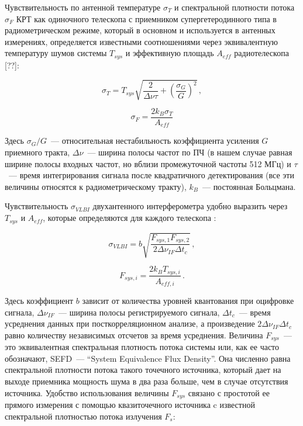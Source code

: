 Чувствительность по антенной температуре $\sigma_T$
и спектральной плотности потока $\sigma_F$ КРТ как одиночного телескопа с приемником
супергетеродинного типа в радиометрическом режиме, который в основном и используется в антенных
измерениях, определяется известными соотношениями через
эквивалентную температуру шумов системы $T_{sys}$ и
эффективную площадь $A_{eff}$ радиотелескопа [??]:

\begin{equation}
 \sigma_T = T_{sys} \sqrt{\frac{2}{\Delta\nu \tau} + \left(\frac{\sigma_G}{G}\right)^2}\,,
\end{equation}

\begin{equation}
 \sigma_F = \frac{2 k_B \sigma_T}{A_{eff}}
\end{equation}

Здесь $\sigma_G/G$~--- относительная нестабильность коэффициента усиления $G$ приемного тракта,
$\Delta \nu$~--- ширина полосы частот по ПЧ (в нашем случае
равная ширине полосы входных частот, но вблизи
промежуточной частоты 512 МГц) и $\tau$~--- время интегрирования сигнала после квадратичного
детектирования (все эти величины относятся к радиометрическому тракту), $k_B$~--- постоянная
Больцмана.

Чувствительность $\sigma_{VLBI}$ двухантенного интерферометра
удобно выразить через $T_{sys}$ и $A_{eff}$, которые определяются для каждого телескопа
\cite{VLBIbook}:

\begin{equation}
 \sigma_{VLBI} = b \sqrt{\frac{F_{sys,1}F_{sys,2}}{2 \Delta \nu_{IF} \Delta t_c}}\,,
\end{equation}

\begin{equation}
 F_{sys,i} = \frac{2 k_B T_{sys,i}}{A_{eff,i}} \,.
\end{equation}

Здесь коэффициент $b$ зависит от количества уровней квантования при оцифровке сигнала, $\Delta
\nu_{IF}$~--- ширина полосы регистрируемого сигнала, $\Delta t_c$~--- время усреднения данных при
посткорреляционном анализе, а произведение $2 \Delta \nu_{IF} \Delta t_c$ равно количеству
независимых отсчетов за время усреднения. Величина $F_{sys}$~--- это эквивалентная спектральная
плотность потока системы или, как ее часто обозначают, SEFD~--- ``System Equivalence Flux Density''.
Она численно равна спектральной плотности потока такого точечного источника, который дает
на выходе приемника мощность шума в два раза больше, чем в случае отсутствия источника. Удобство
использования величины $F_{sys}$ связано с простотой ее прямого измерения с помощью квазиточечного
источника c известной спектральной плотностью потока излучения $F_s$:

